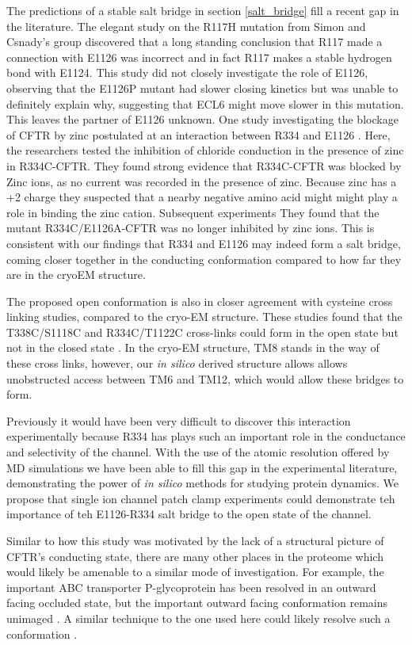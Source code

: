 The predictions of a stable salt bridge in section \ref{salt_bridge} fill a recent gap in the literature. The elegant study on the R117H mutation from Simon and Csnady's group \cite{simon2021}  discovered that a long standing conclusion that R117 made a connection with E1126 was incorrect and in fact R117 makes a stable hydrogen bond with E1124. This study did not closely investigate the role of E1126, observing that the E1126P mutant had slower closing kinetics but was unable to definitely explain why, suggesting that ECL6 might move slower in this mutation. This leaves the partner of E1126 unknown. One study investigating the blockage of CFTR by zinc postulated at an interaction between R334 and E1126 \cite{wang2016}. Here, the researchers tested the inhibition of chloride conduction in the presence of zinc in R334C-CFTR. They found strong evidence that R334C-CFTR was blocked by Zinc ions, as no current was recorded in the presence of zinc. Because zinc has a +2 charge they suspected that a nearby negative amino acid might might play a role in binding the zinc cation. Subsequent experiments They found that the mutant R334C/E1126A-CFTR was no longer inhibited by zinc ions. This is consistent with our findings that R334 and E1126 may indeed form a salt bridge, coming closer together in the conducting conformation compared to how far they are in the cryoEM structure.  

The proposed open conformation is also in closer agreement with cysteine cross linking studies, compared to the cryo-EM structure. These studies found that the T338C/S1118C and R334C/T1122C cross-links could form in the open state but not in the closed state \cite{wang2012}. In the cryo-EM structure, TM8 stands in the way of these cross links, however, our \textit{in silico} derived structure allows allows unobstructed access between TM6 and TM12, which would allow these bridges to form.

Previously it would have been very difficult to discover this interaction experimentally because R334 has plays such an important role in the conductance and selectivity of the channel. With the use of the atomic resolution offered by MD simulations we have been able to fill this gap in the experimental literature, demonstrating the power of \textit {in silico} methods for studying protein dynamics. We propose that single ion channel patch clamp experiments could demonstrate teh importance of teh E1126-R334 salt bridge to the open state of the channel. 

Similar to how this study was motivated by the lack of a structural picture of CFTR's conducting state, there are many other places in the proteome which would likely be amenable to a similar mode of investigation. For example, the important ABC transporter P-glycoprotein has been resolved in an outward facing occluded state, but the important outward facing conformation remains unimaged \cite{}. A similar technique to the one used here could likely resolve such a conformation \cite{kim2018a}.

